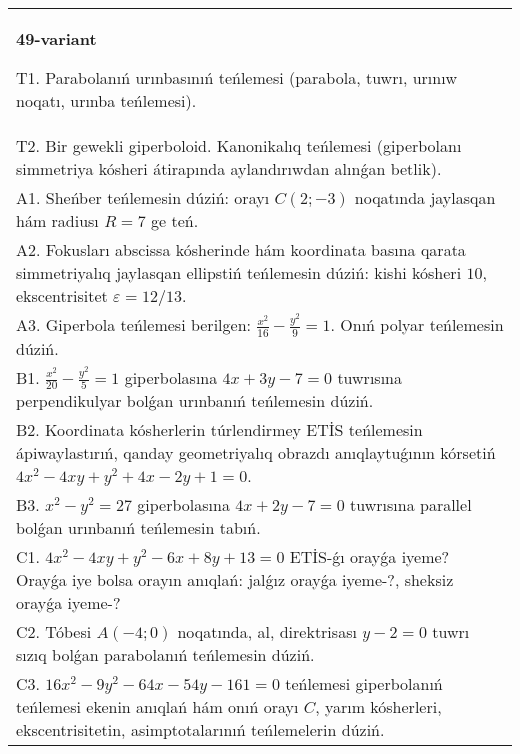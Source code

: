 \documentclass{article}
\begin{document}
\begin{tabular}{m{17cm}}
\textbf{49-variant}
\newline

T1. Parabolanıń urınbasınıń teńlemesi (parabola, tuwrı, urınıw noqatı, urınba teńlemesi).\\

T2. Bir gewekli giperboloid. Kanonikalıq teńlemesi (giperbolanı simmetriya kósheri átirapında aylandırıwdan alınǵan betlik).\\

A1. Sheńber teńlemesin dúziń: orayı $C (2;-3) $ noqatında jaylasqan hám radiusı $R=7$ ge teń.\\

A2. Fokusları abscissa kósherinde hám koordinata basına qarata simmetriyalıq jaylasqan ellipstiń teńlemesin dúziń: kishi kósheri $10$, ekscentrisitet $\varepsilon=12/13$.\\

A3. Giperbola teńlemesi berilgen: $\frac{x^{2}}{16}-\frac{y^{2}}{9}=1$. Onıń polyar teńlemesin dúziń.\\

B1. $\frac{x^{2}}{20} - \frac{y^{2}}{5} = 1$ giperbolasına $4x + 3y - 7 = 0$ tuwrısına perpendikulyar bolǵan urınbanıń teńlemesin dúziń.  \\

B2. Koordinata kósherlerin túrlendirmey ETİS teńlemesin ápiwaylastırıń, qanday geometriyalıq obrazdı anıqlaytuǵının kórsetiń $4x^{2} - 4xy + y^{2} + 4x - 2y + 1 = 0$.  \\

B3. $x^{2} - y^{2} = 27$ giperbolasına $4x + 2y - 7 = 0$ tuwrısına parallel bolǵan urınbanıń teńlemesin tabıń.  \\

C1. $4x^{2} - 4xy + y^{2} - 6x + 8y + 13 = 0$ ETİS-ǵı orayǵa iyeme? Orayǵa iye bolsa orayın anıqlań: jalǵız orayǵa iyeme-?, sheksiz orayǵa iyeme-?  \\

C2. Tóbesi $A(-4;0)$ noqatında, al, direktrisası $y - 2 = 0$ tuwrı sızıq bolǵan parabolanıń teńlemesin dúziń.\\

C3. $16x^{2} - 9y^{2} - 64x - 54y - 161 = 0$ teńlemesi giperbolanıń teńlemesi ekenin anıqlań hám onıń orayı $C$, yarım kósherleri, ekscentrisitetin, asimptotalarınıń teńlemelerin dúziń.  \\

\end{tabular}
\vspace{1cm}
\end{document}
